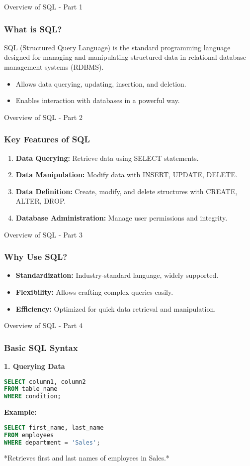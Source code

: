 \documentclass[aspectratio=169]{beamer}
\begin{document}
\begin{frame}[fragile]{Overview of SQL - Part 1}
    \frametitle{What is SQL?}
    SQL (Structured Query Language) is the standard programming language designed for managing and manipulating structured data in relational database management systems (RDBMS). 
    \begin{itemize}
        \item Allows data querying, updating, insertion, and deletion.
        \item Enables interaction with databases in a powerful way.
    \end{itemize}
\end{frame}

\begin{frame}{Overview of SQL - Part 2}
    \frametitle{Key Features of SQL}
    \begin{enumerate}
        \item \textbf{Data Querying:} Retrieve data using SELECT statements.
        \item \textbf{Data Manipulation:} Modify data with INSERT, UPDATE, DELETE.
        \item \textbf{Data Definition:} Create, modify, and delete structures with CREATE, ALTER, DROP.
        \item \textbf{Database Administration:} Manage user permissions and integrity.
    \end{enumerate}
\end{frame}

\begin{frame}{Overview of SQL - Part 3}
    \frametitle{Why Use SQL?}
    \begin{itemize}
        \item \textbf{Standardization:} Industry-standard language, widely supported.
        \item \textbf{Flexibility:} Allows crafting complex queries easily.
        \item \textbf{Efficiency:} Optimized for quick data retrieval and manipulation.
    \end{itemize}
\end{frame}

\begin{frame}[fragile]{Overview of SQL - Part 4}
    \frametitle{Basic SQL Syntax}
    \textbf{1. Querying Data}
    \begin{lstlisting}[language=SQL]
SELECT column1, column2 
FROM table_name 
WHERE condition;
    \end{lstlisting}

    \textbf{Example:}
    \begin{lstlisting}[language=SQL]
SELECT first_name, last_name 
FROM employees 
WHERE department = 'Sales';
    \end{lstlisting}
    *Retrieves first and last names of employees in Sales.*
\end{frame}
\end{document}
